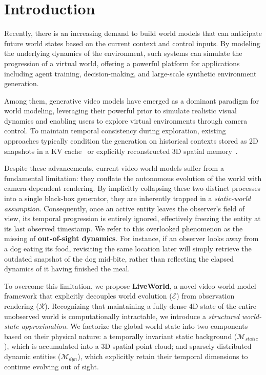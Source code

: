 \section{Introduction}
Recently, there is an increasing demand to build world models that can anticipate future world states based on the current context and control inputs. By modeling the underlying dynamics of the environment, such systems can simulate the progression of a virtual world, offering a powerful platform for applications including agent training\cite{pan,nwm,peva}, decision-making\cite{waymo,magicdrive}, and large-scale synthetic environment generation\cite{genie1,genie3}.

Among them, generative video models have emerged as a dominant paradigm for world modeling, leveraging their powerful prior to simulate realistic visual dynamics and enabling users to explore virtual environments through camera control. To maintain temporal consistency during exploration, existing approaches typically condition the generation on historical contexts stored as 2D snapshots in a KV cache~\cite{selfforcing, longlive} or explicitly reconstructed 3D spatial memory~\cite{spatia, worldplay}.

Despite these advancements, current video world models suffer from a fundamental limitation: they conflate the autonomous evolution of the world with camera-dependent rendering. By implicitly collapsing these two distinct processes into a single black-box generator, they are inherently trapped in a \textit{static-world assumption}. Consequently, once an active entity leaves the observer's field of view, its temporal progression is entirely ignored, effectively freezing the entity at its last observed timestamp. We refer to this overlooked phenomenon as the missing of \textbf{out-of-sight dynamics}. For instance, if an observer looks away from a dog eating its food, revisiting the same location later will simply retrieve the outdated snapshot of the dog mid-bite, rather than reflecting the elapsed dynamics of it having finished the meal.

To overcome this limitation, we propose \textbf{LiveWorld}, a novel video world model framework that explicitly decouples world evolution ($\mathcal{E}$) from observation rendering ($\mathcal{R}$). Recognizing that maintaining a fully dense 4D state of the entire unobserved world is computationally intractable, we introduce a \textit{structured world-state approximation}. We factorize the global world state into two components based on their physical nature: a temporally invariant static background ($\mathcal{M}_{static}$), which is accumulated into a 3D spatial point cloud; and sparsely distributed dynamic entities ($\mathcal{M}_{dyn}$), which explicitly retain their temporal dimensions to continue evolving out of sight. 

